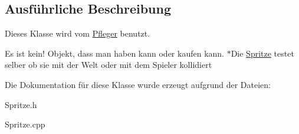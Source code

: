 \subsection{Ausführliche Beschreibung}
Dieses Klasse wird vom \hyperlink{class_pfleger}{Pfleger} benutzt. 

Es ist kein! Objekt, dass man haben kann oder kaufen kann. $\ast$\-Die \hyperlink{class_spritze}{Spritze} testet selber ob sie mit der Welt oder mit dem Spieler kollidiert 

Die Dokumentation für diese Klasse wurde erzeugt aufgrund der Dateien\-:\begin{DoxyCompactItemize}
\item 
Spritze.\-h\item 
Spritze.\-cpp\end{DoxyCompactItemize}

